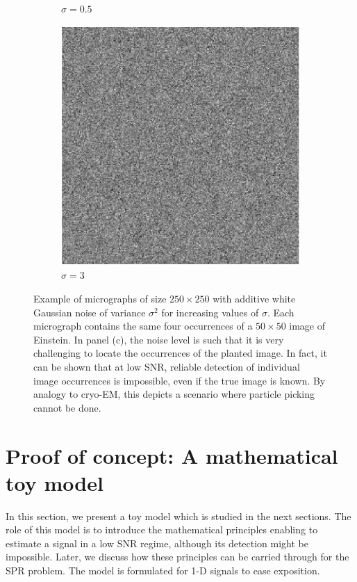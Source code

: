 \documentclass[9pt,twocolumn,twoside,lineno]{pnas-new}
\begin{document}
\begin{figure}[h]
\begin{subfigure}[h]{0.33\textwidth}
		\caption{$\sigma = 0.5$}
	\end{subfigure}
	\begin{subfigure}[h]{0.33\textwidth}
		\centering
		\includegraphics[scale=0.5]{micrograph_Einstein_example_s3}
		\caption{$\sigma = 3$}
	\end{subfigure}
	\caption{\label{fig:micro_example} Example of micrographs of size $250\times 250$ with additive white Gaussian noise of variance $\sigma^2$ for increasing values of $\sigma$. Each micrograph contains the same four occurrences of a $50 \times 50$ image of Einstein. In panel (c), the noise level is such that it is very challenging to locate the occurrences of the planted image. In fact, it can be shown that at low SNR, reliable detection of individual image occurrences is impossible, even if the true image is known. By analogy to cryo-EM, this depicts a scenario where particle picking cannot be done.}	
\end{figure}


\section{Proof of concept: A mathematical toy model}

In this section, we present a toy model which is studied in the next sections. 
The role of this model is to introduce the mathematical principles enabling to estimate a signal in a low SNR regime, although its detection might be impossible. Later, we discuss how these principles can be carried through for the SPR problem. The model is formulated for 1-D signals to ease exposition.   
\end{document}
